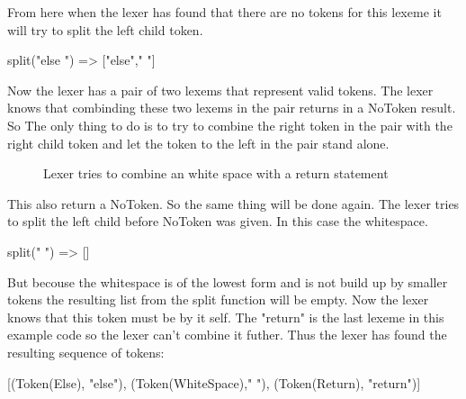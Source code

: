 \begin{example}
From here when the lexer has found that there are no tokens for this lexeme it will try to split the left child token.
\begin{center}
    split("else ") => ["else"," "]
\end{center} 
Now the lexer has a pair of two lexems that represent valid tokens. The lexer knows that combinding these two lexems in the pair returns in a NoToken result. So The only thing to do is to try to combine the right token in the pair with the right child token and let the token to the left in the pair stand alone. 
\begin{figure}[!h]
  \centering
  \caption{Lexer tries to combine an white space with a return statement
  \label{fig4:elseif}}
\end{figure}
This also return a NoToken. So the same thing will be done again. The lexer tries to split the left child before NoToken was given. In this case the whitespace. 
\begin{center}
split(" ") => []
\end{center}
But becouse the whitespace is of the lowest form and is not build up by smaller tokens the resulting list from the split function will be empty. Now the lexer knows that this token must be by it self. The "return" is the last lexeme in this example code so the lexer can't combine it futher. Thus the lexer has found the resulting sequence of tokens:
\begin{center}
    [(Token(Else), "else"), (Token(WhiteSpace)," "), (Token(Return), "return")]
\end{center} 
\end{example}

